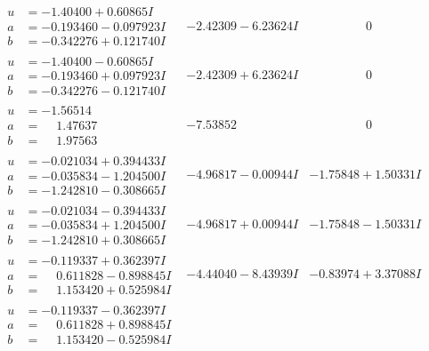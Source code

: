 \documentclass[1p]{elsarticle_modified}
\theoremstyle{definition}
\begin{document}
$$\begin{array}{c|c|c}
 \hline 
\begin{aligned}
u &= -1.40400 + 0.60865 I \\
a &= -0.193460 - 0.097923 I \\
b &= -0.342276 + 0.121740 I\end{aligned}
 & -2.42309 - 6.23624 I & \phantom{-0.000000 } 0 \\ \hline\begin{aligned}
u &= -1.40400 - 0.60865 I \\
a &= -0.193460 + 0.097923 I \\
b &= -0.342276 - 0.121740 I\end{aligned}
 & -2.42309 + 6.23624 I & \phantom{-0.000000 } 0 \\ \hline\begin{aligned}
u &= -1.56514\phantom{ +0.000000I} \\
a &= \phantom{-}1.47637\phantom{ +0.000000I} \\
b &= \phantom{-}1.97563\phantom{ +0.000000I}\end{aligned}
 & -7.53852\phantom{ +0.000000I} & \phantom{-0.000000 } 0 \\ \hline\begin{aligned}
u &= -0.021034 + 0.394433 I \\
a &= -0.035834 - 1.204500 I \\
b &= -1.242810 - 0.308665 I\end{aligned}
 & -4.96817 - 0.00944 I & -1.75848 + 1.50331 I \\ \hline\begin{aligned}
u &= -0.021034 - 0.394433 I \\
a &= -0.035834 + 1.204500 I \\
b &= -1.242810 + 0.308665 I\end{aligned}
 & -4.96817 + 0.00944 I & -1.75848 - 1.50331 I \\ \hline\begin{aligned}
u &= -0.119337 + 0.362397 I \\
a &= \phantom{-}0.611828 - 0.898845 I \\
b &= \phantom{-}1.153420 + 0.525984 I\end{aligned}
 & -4.44040 - 8.43939 I & -0.83974 + 3.37088 I \\ \hline\begin{aligned}
u &= -0.119337 - 0.362397 I \\
a &= \phantom{-}0.611828 + 0.898845 I \\
b &= \phantom{-}1.153420 - 0.525984 I\end{aligned}

\end{array}$$
\end{document}
